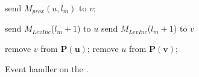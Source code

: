 \begin{algorithm}[!Hbt]
{{{{{                    send $M_{prox}(u, l_m)$ to \md $v$;
                    
                    }
                }
                \Else
                {
                    {
                        send $M_{LevInc}$($l_m + 1$) to \md $u$
                    }
                    {
                        send $M_{LevInc}$($l_m + 1$) to \md $v$
                    }
                }
            }
	    {
		remove $v$ from $\mathbf{P(u)}$;
	    }
	    {
		remove $u$ from $\mathbf{P(v)}$;
	    }
        }
    }
    
\caption{Event handler on the \ls.} \label{algSrv}
\end{algorithm}



